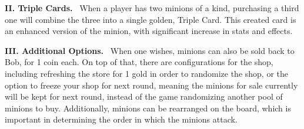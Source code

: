 \documentclass{paper}
\newcommand{\inlineSection}[1]{\vspace{0.5em}\noindent\textbf{#1.}~}
\begin{document}
\inlineSection{II.  Triple Cards}
When a player has two minions of a kind, purchasing a third one will combine the three into a single golden, Triple Card. This created card is an enhanced version of the minion, with significant increase in stats and effects.

\inlineSection{III. Additional Options}
When one wishes, minions can also be sold back to Bob, for 1 coin each. On top of that, there are configurations for the shop, including refreshing the store for 1 gold in order to randomize the shop, or the option to freeze your shop for next round, meaning the minions for sale currently will be kept for next round, instead of the game randomizing another pool of minions to buy\cite{battlegrounds2019}. Additionally, minions can be rearranged on the board, which is important in determining the order in which the minions attack.
\end{document}
